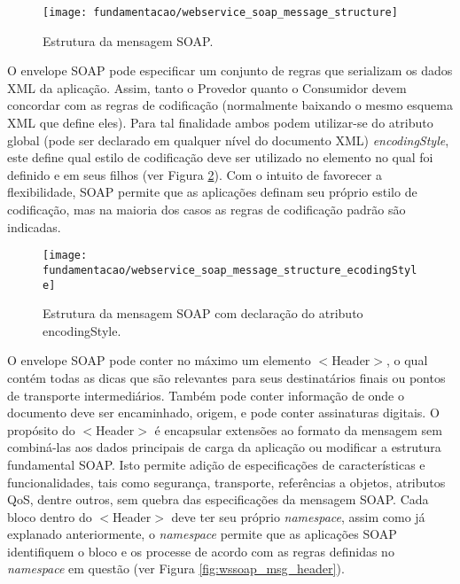 \begin{figure}[!htb] \centering
  \centering
  \texttt{[image: fundamentacao/webservice\_soap\_message\_structure]} 
  \caption{Estrutura da mensagem SOAP.\cite{Papazoglou:2008}} 
  \label{fig:wssoap_msg}
\end{figure}

O envelope SOAP pode especificar um conjunto de regras que serializam os dados XML da aplicação. Assim, tanto o Provedor quanto o Consumidor devem concordar com as regras de codificação (normalmente baixando o mesmo esquema XML que define eles). Para tal finalidade ambos podem utilizar-se do atributo global (pode ser declarado em qualquer nível do documento XML) \textit{encodingStyle}, este define qual estilo de codificação deve ser utilizado no elemento no qual foi definido e em seus filhos (ver Figura \ref{fig:wssoap_msg_ecodingStyle}). Com o intuito de favorecer a flexibilidade, SOAP permite que as aplicações definam seu próprio estilo de codificação, mas na maioria dos casos as regras de codificação padrão são indicadas.\cite{Papazoglou:2008}

\begin{figure}[!htb] \centering
  \centering
  \texttt{[image: fundamentacao/webservice\_soap\_message\_structure\_ecodingStyle]} 
  \caption{Estrutura da mensagem SOAP com declaração do atributo encodingStyle.\cite{Papazoglou:2008}} 
  \label{fig:wssoap_msg_ecodingStyle}
\end{figure}

O envelope SOAP pode conter no máximo um elemento $<$Header$>$, o qual contém todas as dicas que são relevantes para seus destinatários finais ou pontos de transporte intermediários. Também pode conter informação de onde o documento deve ser encaminhado, origem, e pode conter assinaturas digitais. O propósito do $<$Header$>$ é encapsular extensões ao formato da mensagem sem combiná-las aos dados principais de carga da aplicação ou modificar a estrutura fundamental SOAP. Isto permite adição de especificações de características e funcionalidades, tais como segurança, transporte, referências a objetos, atributos QoS\footnotemark {}, dentre outros, sem quebra das especificações da mensagem SOAP. Cada bloco dentro do $<$Header$>$ deve ter seu próprio \textit{namespace}, assim como já explanado anteriormente, o \textit{namespace} permite que as aplicações SOAP identifiquem o bloco e os processe de acordo com as regras definidas no \textit{namespace} em questão (ver Figura \ref{fig:wssoap_msg_header}).\cite{Papazoglou:2008}

